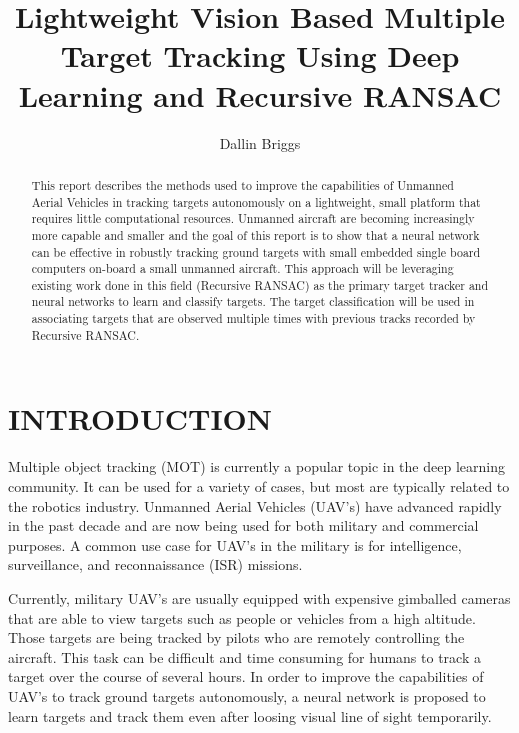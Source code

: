 \documentclass[letterpaper, 10 pt, conference]{ieeeconf}  %
\title{\LARGE \bf
Lightweight Vision Based Multiple Target Tracking Using Deep Learning and Recursive RANSAC
}
\author{Dallin Briggs}
\begin{document}
\maketitle
\thispagestyle{empty}
\pagestyle{empty}


\begin{abstract}

This report describes the methods used to improve the capabilities of Unmanned Aerial Vehicles in tracking targets autonomously on a lightweight, small platform that requires little computational resources. Unmanned aircraft are becoming increasingly more capable and smaller and the goal of this report is to show that a neural network can be effective in robustly tracking ground targets with small embedded single board computers on-board a small unmanned aircraft. This approach will be leveraging existing work done in this field (Recursive RANSAC) as the primary target tracker and neural networks to learn and classify targets. The target classification will be used in associating targets that are observed multiple times with previous tracks recorded by Recursive RANSAC.

\end{abstract}


\section{INTRODUCTION}

Multiple object tracking (MOT) is currently a popular topic in the deep learning community. It can be used for a variety of cases, but most are typically related to the robotics industry. Unmanned Aerial Vehicles (UAV's) have advanced rapidly in the past decade and are now being used for both military and commercial purposes. A common use case for UAV's in the military is for intelligence, surveillance, and reconnaissance (ISR) missions. 

Currently, military UAV's are usually equipped with expensive gimballed cameras that are able to view targets such as people or vehicles from a high altitude. Those targets are being tracked by pilots who are remotely controlling the aircraft. This task can be difficult and time consuming for humans to track a target over the course of several hours. In order to improve the capabilities of UAV's to track ground targets autonomously, a neural network is proposed to learn targets and track them even after loosing visual line of sight temporarily.
\end{document}
